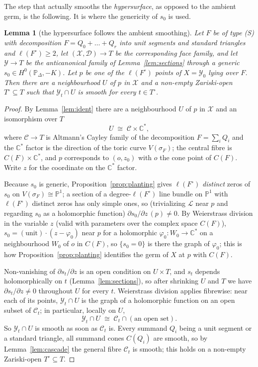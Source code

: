 \documentclass[11pt]{amsart}
\newtheorem{lemma}[theorem]{Lemma}
\theoremstyle{definition}
\theoremstyle{remark}
\newcommand{\CC}{\mathbb{C}}
\newcommand{\PP}{\mathbb{P}}
\begin{document}
The step that actually smooths the \emph{hypersurface}, as opposed to the
ambient germ, is the following.  It is where the genericity of $s_0$ is
used.

\begin{lemma}[the hypersurface follows the ambient smoothing]
\label{lem:transverse}
Let $F$ be of type \textup{(S)} with decomposition
$F = Q_0 + \dots + Q_r$ into unit segments and standard triangles and
$\ell(F^\circ)\ge2$, let $(\mathcal X,\mathcal D)\to T$ be the
corresponding face family, and let $\mathcal Y \to T$ be the anticanonical
family of Lemma~\textup{\ref{lem:sections}} through a generic
$s_0 \in H^0(\PP_\Delta,-K)$.  Let $p$ be one of the $\ell(F^\circ)$
points of $X = \mathcal Y_0$ lying over $F$.  Then there are a
neighbourhood $U$ of $p$ in $\mathcal X$ and a non-empty Zariski-open
$T^\circ \subseteq T$ such that $\mathcal Y_t \cap U$ is smooth for every
$t \in T^\circ$.
\end{lemma}

\begin{proof}
By Lemma~\ref{lem:ident} there are a neighbourhood $U$ of $p$ in
$\mathcal X$ and an isomorphism over $T$
\[
U \;\cong\; \mathcal{C} \times \CC^\ast ,
\]
where $\mathcal C \to T$ is Altmann's Cayley family of the decomposition
$F = \sum_i Q_i$ and the $\CC^\ast$ factor is the direction of the toric
curve $V(\sigma_F)$; the central fibre is $C(F)\times\CC^\ast$, and $p$
corresponds to $(o, z_0)$ with $o$ the cone point of $C(F)$.  Write $z$
for the coordinate on the $\CC^\ast$ factor.

Because $s_0$ is generic, Proposition~\ref{prop:planting} gives
$\ell(F^\circ)$ \emph{distinct} zeros of $s_0$ on
$V(\sigma_F) \cong \PP^1$; a section of a degree-$\ell(F^\circ)$ line
bundle on $\PP^1$ with $\ell(F^\circ)$ distinct zeros has only simple
ones, so (trivializing $\mathcal L$ near $p$ and regarding $s_0$ as a
holomorphic function)
$\partial s_0/\partial z \,(p) \neq 0$.  By Weierstrass division in the
variable $z$ (valid with parameters over the complex space $C(F)$),
$s_0 = (\text{unit})\cdot(z - \varphi_0)$ near $p$ for a holomorphic
$\varphi_0 : W_0 \to \CC^\ast$ on a neighbourhood $W_0$ of $o$ in
$C(F)$, so $\{s_0 = 0\}$ is there the graph of $\varphi_0$; this is
how Proposition~\ref{prop:planting} identifies the germ of $X$ at $p$
with $C(F)$.

Non-vanishing of $\partial s_t/\partial z$ is an open condition on
$U \times T$, and $s_t$ depends holomorphically on $t$
(Lemma~\ref{lem:sections}), so after shrinking $U$ and $T$ we have
$\partial s_t/\partial z \neq 0$ throughout $U$ for every $t$.
Weierstrass division applies fibrewise: near each of its points,
$\mathcal Y_t \cap U$ is the graph of a holomorphic function on an open
subset of $\mathcal C_t$; in particular, locally on $U$,
\[
\mathcal Y_t \cap U \;\cong\; \mathcal{C}_t \cap (\text{an open set}) .
\]
So $\mathcal Y_t \cap U$ is smooth as soon as $\mathcal C_t$ is.  Every
summand $Q_i$ being a unit segment or a standard triangle, all summand
cones $C(Q_i)$ are smooth, so by Lemma~\ref{lem:cascade} the general
fibre $\mathcal C_t$ is smooth; this holds on a non-empty Zariski-open
$T^\circ \subseteq T$.
\end{proof}
\end{document}

